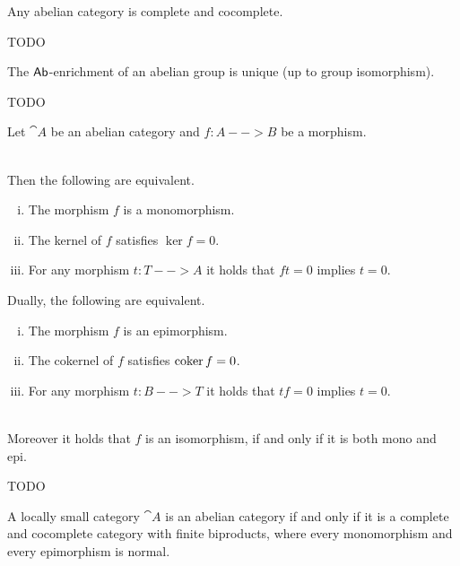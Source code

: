 	\begin{corollary}
		Any abelian category is complete and cocomplete.
	\end{corollary}
	\begin{sketch}
		TODO
	\end{sketch}

	\begin{theorem}
		The $\textsf{Ab}$-enrichment of an abelian group is unique (up to group isomorphism).
	\end{theorem}
	\begin{sketch}
		TODO
	\end{sketch}

	\begin{proposition}
		Let $\cat{A}$ be an abelian category and $f:A-->B$ be a morphism.
		
		~\\
		Then the following are equivalent.
		\begin{enumerate}[(i)]
			\item{
				The morphism $f$ is a monomorphism.
			}
			\item{
				The kernel of $f$ satisfies $\ker f = 0$.
			}
			\item{
				For any morphism $t:T-->A$ it holds that $ft = 0$ implies $t = 0$.
			}
		\end{enumerate}
		Dually, the following are equivalent.
		\begin{enumerate}[(i)]
			\item{
				The morphism $f$ is an epimorphism.
			}
			\item{
				The cokernel of $f$ satisfies $\operatorname{coker} f = 0$.
			}
			\item{
				For any morphism $t:B-->T$ it holds that $tf = 0$ implies $t = 0$.
			}
		\end{enumerate}

		~\\
		Moreover it holds that $f$ is an isomorphism, if and only if it is both mono and epi.
	\end{proposition}
	\begin{sketch}
		TODO
	\end{sketch}

	\begin{corollary}
		A locally small category $\cat{A}$ is an abelian category if and only if it is a complete and cocomplete category with finite biproducts, where every monomorphism and every epimorphism is normal.
	\end{corollary}

